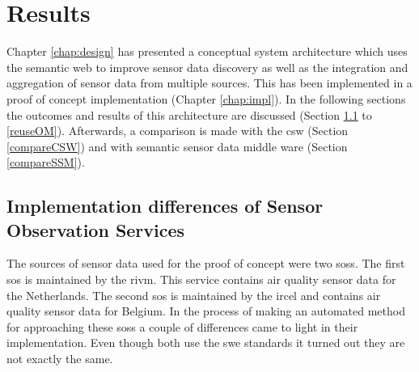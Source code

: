 

\chapter{Results}
\label{chap:results}

Chapter \ref{chap:design} has presented a conceptual system architecture which uses the semantic web to improve sensor data discovery as well as the integration and aggregation of sensor data from multiple sources. This has been implemented in a proof of concept implementation (Chapter \ref{chap:impl}). In the following sections the outcomes and results of this architecture are discussed (Section \ref{par:differences} to \ref{reuseOM}). Afterwards, a comparison is made with the \acf{csw} (Section \ref{compareCSW}) and with semantic sensor data middle ware (Section \ref{compareSSM}). 

\section{Implementation differences of Sensor Observation Services}
\label{par:differences}
The sources of sensor data used for the proof of concept were two \aclp{sos}. The first \ac{sos} is maintained by the \acf{rivm}. This service contains air quality sensor data for the Netherlands. The second \ac{sos} is maintained by the \ac{ircel} and contains air quality sensor data for Belgium. In the process of making an automated method for approaching these \aclp{sos} a couple of differences came to light in their implementation. Even though both use the \ac{swe} standards it turned out they are not exactly the same. 

